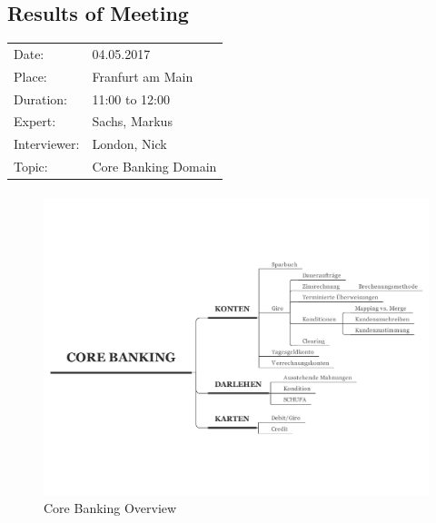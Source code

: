 \subsection*{Results of Meeting }
\begin{tabular}{l l}
Date: & 04.05.2017 \\
Place: & Franfurt am Main \\
Duration: & 11:00 to 12:00 \\
Expert: & Sachs, Markus \\
Interviewer: & London, Nick \\
Topic: & Core Banking Domain
\end{tabular}

\paragraph{}
\begin{figure}[H]
    \centering
    \includegraphics[angle=270, width=\textwidth]{img/CoreBanking.pdf}
    \captionsetup{labelformat=empty}
    \caption[]{Core Banking Overview}
    \label{fig:cbOver}
\end{figure}